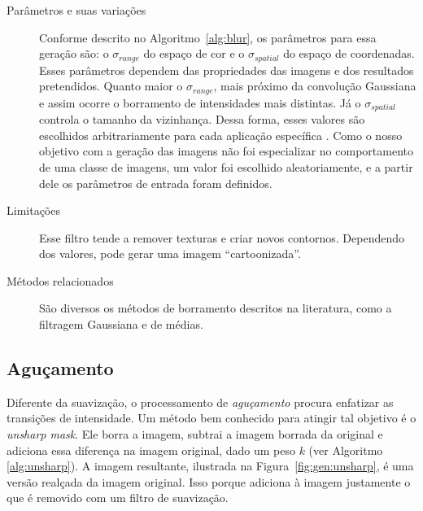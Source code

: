 \begin{description}
  \item[Parâmetros e suas variações] Conforme descrito no Algoritmo~\ref{alg:blur}, os parâmetros para essa geração são: o $\sigma_{range}$ do espaço de cor e o $\sigma_{spatial}$ do espaço de coordenadas. Esses parâmetros dependem das propriedades das imagens e dos resultados pretendidos. Quanto maior o $\sigma_{range}$, mais próximo da convolução Gaussiana e assim ocorre o borramento de intensidades mais distintas. Já o $\sigma_{spatial}$ controla o tamanho da vizinhança. Dessa forma, esses valores são escolhidos arbitrariamente para cada aplicação específica \cite{Tomasi1998}. Como o nosso objetivo com a geração das imagens não foi especializar no comportamento de uma classe de imagens, um valor foi escolhido aleatoriamente, e a partir dele os parâmetros de entrada foram definidos.

  \item[Limitações] Esse filtro tende a remover texturas e criar novos contornos. Dependendo dos valores, pode gerar uma imagem ``cartoonizada''.

  \item[Métodos relacionados] São diversos os métodos de borramento descritos na literatura, como a filtragem Gaussiana e de médias.
\end{description}
\FloatBarrier
\subsection{Aguçamento}

Diferente da suavização, o processamento de \emph{aguçamento} procura enfatizar as transições de intensidade. Um método bem conhecido para atingir tal objetivo é o \textit{unsharp mask}. Ele borra a imagem, subtrai a imagem borrada da original e adiciona essa diferença na imagem original, dado um peso $k$ (ver Algoritmo \ref{alg:unsharp}). A imagem resultante, ilustrada na Figura~\ref{fig:gen:unsharp}, é uma versão realçada da imagem original. Isso porque adiciona à imagem justamente o que é removido com um filtro de suavização.

